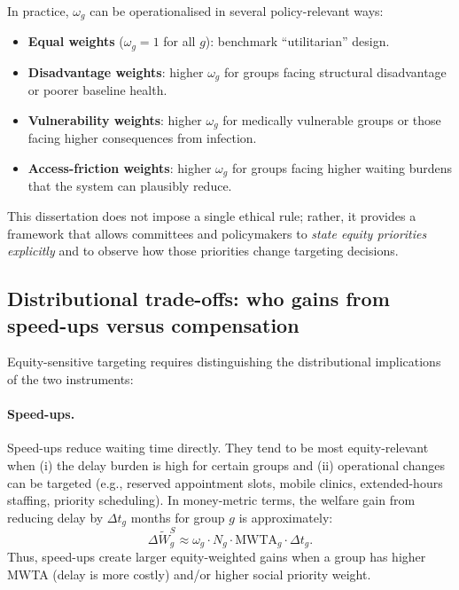 \documentclass[doublespacing]{utdthesis}
\begin{document}
In practice, $\omega_g$ can be operationalised in several policy-relevant ways:
\begin{itemize}[leftmargin=*]
\item \textbf{Equal weights} ($\omega_g=1$ for all $g$): benchmark ``utilitarian'' design.
\item \textbf{Disadvantage weights}: higher $\omega_g$ for groups facing structural disadvantage or poorer baseline health.
\item \textbf{Vulnerability weights}: higher $\omega_g$ for medically vulnerable groups or those facing higher consequences from infection.
\item \textbf{Access-friction weights}: higher $\omega_g$ for groups facing higher waiting burdens that the system can plausibly reduce.
\end{itemize}

This dissertation does not impose a single ethical rule; rather, it provides a framework that allows committees and policymakers to \emph{state equity priorities explicitly} and to observe how those priorities change targeting decisions.

\subsection{Distributional trade-offs: who gains from speed-ups versus compensation}
\label{subsec:essay3_tradeoffs}

Equity-sensitive targeting requires distinguishing the distributional implications of the two instruments:

\paragraph{Speed-ups.}
Speed-ups reduce waiting time directly. They tend to be most equity-relevant when (i) the delay burden is high for certain groups and (ii) operational changes can be targeted (e.g., reserved appointment slots, mobile clinics, extended-hours staffing, priority scheduling). In money-metric terms, the welfare gain from reducing delay by $\Delta t_g$ months for group $g$ is approximately:
\begin{equation}
\Delta \widetilde{W}^{S}_g \approx \omega_g \cdot N_g \cdot \text{MWTA}_g \cdot \Delta t_g.
\label{eq:equity_speedup_gain}
\end{equation}
Thus, speed-ups create larger equity-weighted gains when a group has higher MWTA (delay is more costly) and/or higher social priority weight.
\end{document}
